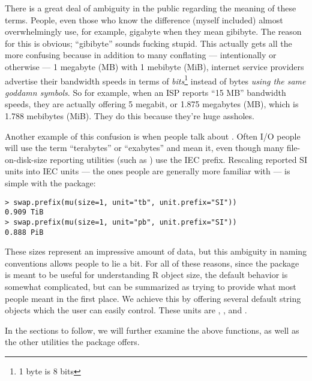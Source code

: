 There is a great deal of ambiguity in the public regarding the meaning of these terms.  People, even those who know the difference (myself included) almost overwhelmingly use, for example, gigabyte when they mean gibibyte.  The reason for this is obvious; ``gibibyte'' sounds fucking stupid.  This actually gets all the more confusing because in addition to many conflating --- intentionally or otherwise --- 1 megabyte (MB) with 1 mebibyte (MiB), internet service providers advertise their bandwidth speeds in terms of \emph{bits}\footnote{1 byte is 8 bits} instead of bytes \emph{using the same goddamn symbols}.  So for example, when an ISP reports ``15 MB'' bandwidth speeds, they are actually offering 5 megabit, or  1.875 megabytes (MB), which is 1.788 mebibytes (MiB).  They do this because they're huge assholes.

Another example of this confusion is when people talk about .  Often I/O people will use the term ``terabytes'' or ``exabytes'' and mean it, even though many file-on-disk-size reporting utilities (such as ) use the IEC prefix.  Rescaling reported SI units into IEC units --- the ones people are generally more familiar with --- is simple with the  package:
\begin{lstlisting}[language=rr]
> swap.prefix(mu(size=1, unit="tb", unit.prefix="SI"))
0.909 TiB
> swap.prefix(mu(size=1, unit="pb", unit.prefix="SI"))
0.888 PiB
\end{lstlisting}

These sizes represent an impressive amount of data, but this ambiguity in naming conventions allows people to lie a bit.  For all of these reasons, since the package is meant to be useful for understanding R object size, the default behavior is somewhat complicated, but can be summarized as trying to provide what most people meant in the first place.  We achieve this by offering several default string objects which the user can easily control.  These units are , , and .  

In the sections to follow, we will further examine the above  functions, as well as the other utilities the package offers.



